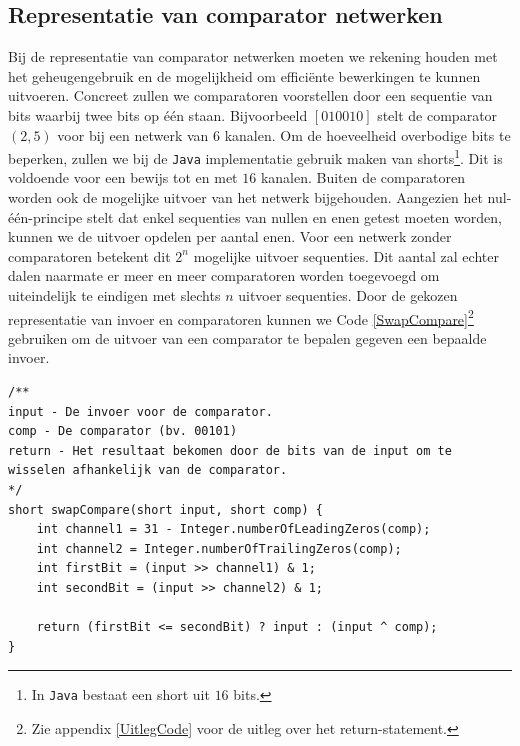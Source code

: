 \documentclass{article}
\begin{document}
\subsection{Representatie van comparator netwerken}\label{RepresentatieVanComparatorNetwerken}
Bij de representatie van comparator netwerken moeten we rekening houden met het geheugengebruik en de mogelijkheid om effici\"ente bewerkingen te kunnen uitvoeren.
Concreet zullen we comparatoren voorstellen door een sequentie van bits waarbij twee bits op \'e\'en staan.
Bijvoorbeeld  $ \left[ 0 1 0 0 1 0 \right]$ stelt de comparator $\left(2,5\right)$ voor bij een netwerk van $6$ kanalen.
Om de hoeveelheid overbodige bits te beperken, zullen we bij de \texttt{Java} implementatie gebruik maken van shorts\footnote{In \texttt{Java} bestaat een short uit $16$ bits.}.
Dit is voldoende voor een bewijs tot en met $16$ kanalen.
Buiten de comparatoren worden ook de mogelijke uitvoer van het netwerk bijgehouden.
Aangezien het nul-\'e\'en-principe stelt dat enkel sequenties van nullen en enen getest moeten worden, kunnen we de uitvoer opdelen per aantal enen.
Voor een netwerk zonder comparatoren betekent dit $2^n$ mogelijke uitvoer sequenties.
Dit aantal zal echter dalen naarmate er meer en meer comparatoren worden toegevoegd om uiteindelijk te eindigen met slechts $n$ uitvoer sequenties.
Door de gekozen representatie van invoer en comparatoren kunnen we Code \ref{SwapCompare}\footnote{Zie appendix \ref{UitlegCode} voor de uitleg over het return-statement.} gebruiken om de uitvoer van een comparator te bepalen gegeven een bepaalde invoer.
\begin{lstlisting}[caption={swapCompare},label=SwapCompare]
/**
input - De invoer voor de comparator.
comp - De comparator (bv. 00101)
return - Het resultaat bekomen door de bits van de input om te wisselen afhankelijk van de comparator.
*/
short swapCompare(short input, short comp) {
	int channel1 = 31 - Integer.numberOfLeadingZeros(comp);
	int channel2 = Integer.numberOfTrailingZeros(comp);
	int firstBit = (input >> channel1) & 1;
	int secondBit = (input >> channel2) & 1;
	
	return (firstBit <= secondBit) ? input : (input ^ comp);
}
\end{lstlisting}
\end{document}

